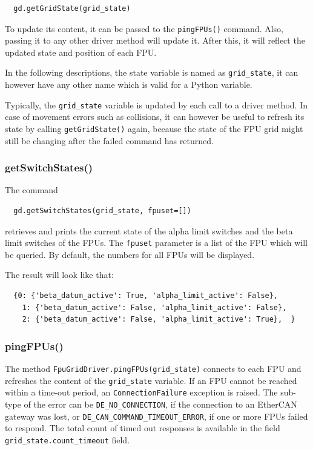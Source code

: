 \documentclass[11pt,a4paper]{scrartcl}
\begin{document}
\begin{verbatim}
  gd.getGridState(grid_state)
\end{verbatim}

To update its content, it can be passed to the \texttt{pingFPUs()}
command. Also, passing it to any other driver method will update
it. After this, it will reflect the updated state and position of each
FPU.

In the following descriptions, the state variable is named as
\texttt{grid\_state}, it can however have any other name which is
valid for a Python variable.

Typically, the \texttt{grid\_state} variable is updated by each call
to a driver method. In case of movement errors such as collisions, it
can however be useful to refresh its state by calling
\texttt{getGridState()} again, because the state of the FPU grid might
still be changing after the failed command has returned.

\subsubsection{getSwitchStates()}

The command
\begin{verbatim}
  gd.getSwitchStates(grid_state, fpuset=[])
\end{verbatim}
retrieves and prints the current state of the alpha limit switches
and the beta limit switches of the FPUs.  The \texttt{fpuset}
parameter is a list of the FPU which will be queried. By default, the
numbers for all FPUs will be displayed.

The result will look like that:
\begin{verbatim}
  {0: {'beta_datum_active': True, 'alpha_limit_active': False},
    1: {'beta_datum_active': False, 'alpha_limit_active': False},
    2: {'beta_datum_active': False, 'alpha_limit_active': True},  }
\end{verbatim}




\subsubsection{pingFPUs()}
\begin{sloppypar}
  The method
\texttt{FpuGridDriver.pingFPUs(grid\_state)} connects to each FPU and
refreshes the content of the \texttt{grid\_state} variable. If an FPU
cannot be reached within a time-out period, an
\texttt{ConnectionFailure} exception is raised. The sub-type of the
error can be \texttt{DE\_NO\_CONNECTION}, if the connection to an
EtherCAN gateway was lost, or
\texttt{DE\_CAN\_COMMAND\_TIMEOUT\_ERROR}, if one or more FPUs failed
to respond. The total count of timed out responses is available in the
field \texttt{grid\_state.count\_timeout} field.
\end{sloppypar}
\end{document}
